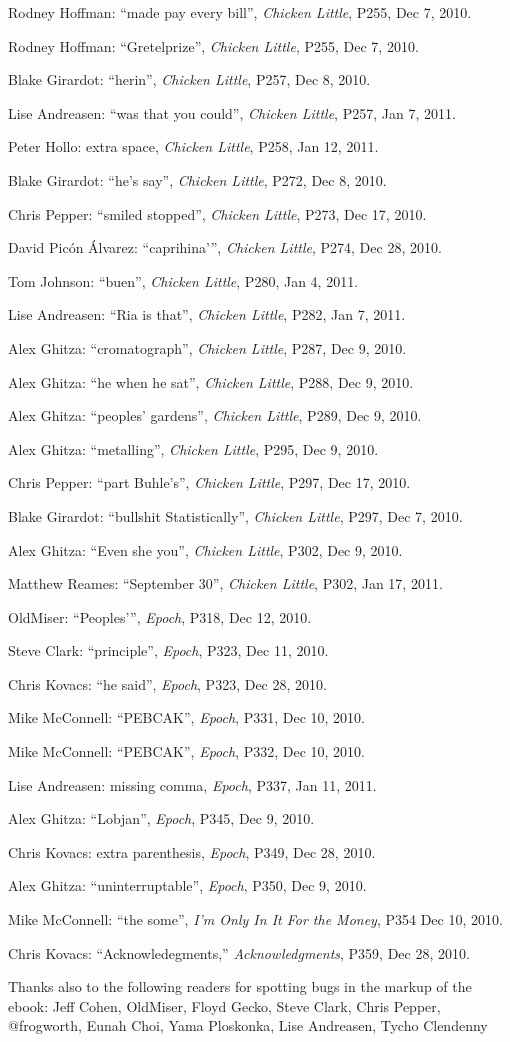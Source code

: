 \begin{flushleft}
Rodney Hoffman: “made pay every bill”, \emph{Chicken Little}, P255, 
Dec 7, 2010.

Rodney Hoffman: “Gretelprize”, \emph{Chicken Little}, P255, Dec 7, 
2010.

Blake Girardot: “herin”, \emph{Chicken Little}, P257, Dec 8, 2010.

Lise Andreasen: “was that you could”, \emph{Chicken Little}, P257, 
Jan 7, 2011.

Peter Hollo: extra space, \emph{Chicken Little}, P258, Jan 12, 2011.

Blake Girardot: “he's say”, \emph{Chicken Little}, P272, Dec 8, 
2010.

Chris Pepper: “smiled stopped”, \emph{Chicken Little}, P273, Dec 
17, 2010.

David Picón Álvarez: “caprihina'”, \emph{Chicken Little}, P274, 
Dec 28, 2010.

Tom Johnson: “buen”, \emph{Chicken Little}, P280, Jan 4, 2011.

Lise Andreasen: “Ria is that”, \emph{Chicken Little}, P282, Jan 7, 
2011.

Alex Ghitza: “cromatograph”, \emph{Chicken Little}, P287, Dec 9, 
2010.

Alex Ghitza: “he when he sat”, \emph{Chicken Little}, P288, Dec 9, 
2010.

Alex Ghitza: “peoples' gardens”, \emph{Chicken Little}, P289, Dec 
9, 2010.

Alex Ghitza: “metalling”, \emph{Chicken Little}, P295, Dec 9, 2010.

Chris Pepper: “part Buhle's”, \emph{Chicken Little}, P297, Dec 17, 
2010.

Blake Girardot: “bullshit Statistically”, \emph{Chicken Little}, 
P297, Dec 7, 2010.

Alex Ghitza: “Even she you”, \emph{Chicken Little}, P302, Dec 9, 
2010.

Matthew Reames: “September 30”, \emph{Chicken Little}, P302, Jan 
17, 2011.

OldMiser: “Peoples'”, \emph{Epoch}, P318, Dec 12, 2010.

Steve Clark: “principle”, \emph{Epoch}, P323, Dec 11, 2010.

Chris Kovacs: “he said”, \emph{Epoch}, P323, Dec 28, 2010.

Mike McConnell: “PEBCAK”, \emph{Epoch}, P331, Dec 10, 2010.

Mike McConnell: “PEBCAK”, \emph{Epoch}, P332, Dec 10, 2010.

Lise Andreasen: missing comma, \emph{Epoch}, P337, Jan 11, 2011.

Alex Ghitza: “Lobjan”, \emph{Epoch}, P345, Dec 9, 2010.

Chris Kovacs: extra parenthesis, \emph{Epoch}, P349, Dec 28, 2010.

Alex Ghitza: “uninterruptable”, \emph{Epoch}, P350, Dec 9, 2010.

Mike McConnell: “the some”, \emph{I'm Only In It For the Money}, 
P354 Dec 10, 2010.

Chris Kovacs: “Acknowledegments,” \emph{Acknowledgments}, P359, Dec 
28, 2010.
\end{flushleft}

Thanks also to the following readers for spotting bugs in the markup of 
the ebook: Jeff Cohen, OldMiser, Floyd Gecko, Steve Clark, Chris 
Pepper, @frogworth, Eunah Choi, Yama Ploskonka, Lise Andreasen, Tycho 
Clendenny



